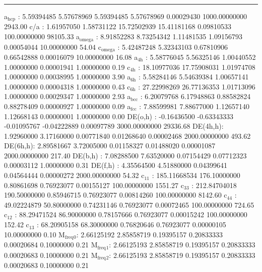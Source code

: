 \documentclass[11pt]{article}
\begin{document}
\noindent\rule{\textwidth}{0.5pt}
a\(_{\text{hcp}}\)   :   5.59394485   5.57678969   5.59394485   5.57678969   0.00029430 1000.00000000      2943.00
c/a     :   1.61957050   1.58731122  15.72502939  15.41181168   0.09810533 100.00000000     98105.33
a\(_{\text{omega}}\) :   8.91852283   8.73254342   1.11481535   1.09156793   0.00054044  10.00000000        54.04
c\(_{\text{omega}}\) :   5.42487248   5.32343103   0.67810906   0.66542888   0.00016079  10.00000000        16.08
a\(_{\text{4h}}\)    :   5.58776045   5.56325146   1.00440552   1.00000000   0.00001941   1.00000000         0.19
c\(_{\text{4h}}\)    :  18.10977036  17.75908031   1.01974708   1.00000000   0.00038995   1.00000000         3.90
a\(_{\text{6h}}\)    :   5.58284146   5.54639384   1.00657141   1.00000000   0.00004318   1.00000000         0.43
c\(_{\text{6h}}\)    :  27.22998269  26.77136353   1.01713096   1.00000000   0.00029347   1.00000000         2.93
a\(_{\text{bcc}}\)   :   6.20079768   6.17948863   0.88582824   0.88278409   0.00000927   1.00000000         0.09
a\(_{\text{fcc}}\)   :   7.88599981   7.88677000   1.12657140   1.12668143   0.00000001   1.00000000         0.00
DE(o,h) :  -0.16436500  -0.63343333  -0.01095767  -0.04222889   0.00097789 3000.00000000     29336.68
DE(4h,h):   1.92960000   3.17160000   0.00771840   0.01268640   0.00002468 2000.00000000       493.62
DE(6h,h):   2.89581667   3.72005000   0.01158327   0.01488020   0.00001087 2000.00000000       217.40
DE(b,h) :   7.08288500   7.63520000   0.07154429   0.07712323   0.00003112   1.00000000         0.31
DE(f,h) :   4.35564500   4.51880000   0.04399641   0.04564444   0.00000272 2000.00000000        54.32
c\(_{\text{11}}\)    : 185.11668534 176.10000000   0.80861698   0.76923077   0.00155127 100.00000000      1551.27
c\(_{\text{33}}\)    : 212.84704018 190.50000000   0.85946715   0.76923077   0.00814260 100.00000000      8142.60
c\(_{\text{44}}\)    :  49.02224879  50.80000000   0.74231146   0.76923077   0.00072465 100.00000000       724.65
c\(_{\text{12}}\)    :  88.29471524  86.90000000   0.78157666   0.76923077   0.00015242 100.00000000       152.42
c\(_{\text{13}}\)    :  68.20905158  68.30000000   0.76820646   0.76923077   0.00000105  10.00000000         0.10
M\(_{\text{freq}}\)\(_{\text{0}}\):   2.66125192   2.85858719   0.19395157   0.20833333   0.00020684   0.10000000         0.21
M\(_{\text{freq}}\)\(_{\text{1}}\):   2.66125193   2.85858719   0.19395157   0.20833333   0.00020683   0.10000000         0.21
M\(_{\text{freq}}\)\(_{\text{2}}\):   2.66125193   2.85858719   0.19395157   0.20833333   0.00020683   0.10000000         0.21
\end{document}
